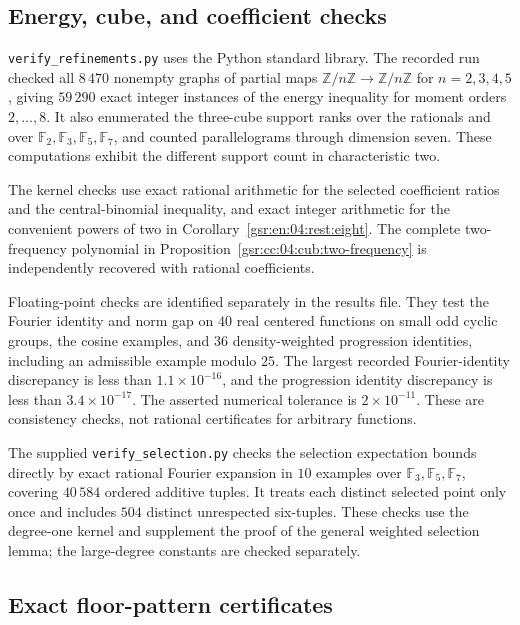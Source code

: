 \documentclass[11pt,letterpaper]{article}
\numberwithin{equation}{section}
\theoremstyle{definition}
\theoremstyle{remark}
\newcommand{\1}{\mathbf 1}
\begin{document}
\subsection{Energy, cube, and coefficient checks}

\texttt{verify\_refinements.py} uses the Python standard library.  The
recorded run checked all \(8\,470\) nonempty graphs of partial maps
\(\mathbb Z/n\mathbb Z\to\mathbb Z/n\mathbb Z\) for
\(n=2,3,4,5\), giving \(59\,290\) exact integer instances of the energy
inequality for moment orders \(2,\ldots,8\).
It also enumerated the three-cube support ranks over the rationals and
over \(\mathbb F_2,\mathbb F_3,\mathbb F_5,\mathbb F_7\), and counted
parallelograms through dimension seven.  These computations exhibit the
different support count in characteristic two.

The kernel checks use exact rational arithmetic for the selected
coefficient ratios and the central-binomial inequality, and exact integer
arithmetic for the convenient powers of two in
Corollary~\ref{gsr:en:04:rest:eight}.  The complete
two-frequency polynomial in Proposition~\ref{gsr:cc:04:cub:two-frequency} is
independently recovered with rational coefficients.

Floating-point checks are identified separately in the results file.
They test the Fourier identity and norm gap on \(40\) real centered
functions on small odd cyclic groups, the cosine examples, and \(36\)
density-weighted progression identities, including an admissible example
modulo \(25\).  The largest recorded Fourier-identity discrepancy is less
than \(1.1\times10^{-16}\), and the progression identity discrepancy is
less than \(3.4\times10^{-17}\).  The asserted numerical tolerance is
\(2\times10^{-11}\).  These are consistency checks, not rational
certificates for arbitrary functions.

The supplied \texttt{verify\_selection.py} checks the selection expectation
bounds directly by exact rational Fourier expansion in \(10\) examples
over \(\mathbb F_3,\mathbb F_5,\mathbb F_7\), covering \(40\,584\) ordered
additive tuples.  It treats each distinct selected point only once and
includes \(504\) distinct unrespected six-tuples.  These checks use the
degree-one kernel and supplement the proof of the general weighted
selection lemma; the large-degree constants are checked separately.

\subsection{Exact floor-pattern certificates}
\end{document}
